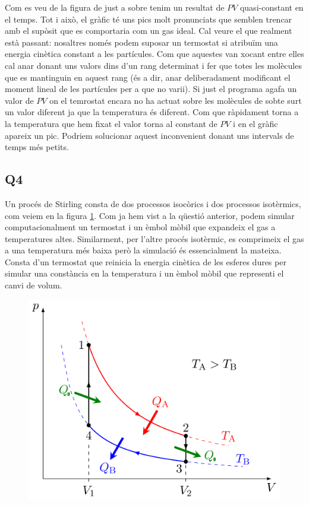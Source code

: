 \documentclass{article}
\begin{document}
	Com es veu de la figura de just a sobre tenim un resultat de $PV$ quasi-constant en el temps. Tot i això, el gràfic té uns pics molt pronunciats que semblen trencar amb el supòsit que es comportaria com un gas ideal. Cal veure el que realment està passant: nosaltres només podem suposar un termostat si atribuïm una energia cinètica constant a les partícules. Com que aquestes van xocant entre elles cal anar donant uns valors dins d'un rang determinat i fer que totes les molècules que es mantinguin en aquest rang (és a dir, anar deliberadament modificant el moment lineal de les partícules per a que no varii). Si just el programa agafa un valor de $PV$ on el temrostat encara no ha actuat sobre les molècules de sobte surt un valor diferent ja que la temperatura és diferent. Com que ràpidament torna a la temperatura que hem fixat el valor torna al constant de $PV$ i en el gràfic apareix un pic. Podriem solucionar aquest inconvenient donant uns intervals de temps més petits.
	
	
	
	\subsection*{Q4}
	Un procés de Stirling consta de dos processos isocòrics i dos processos isotèrmics, com veiem en la figura \ref{gurururur}.
	Com ja hem vist a la qüestió anterior, podem simular computacionalment un termostat i un èmbol mòbil que expandeix el gas a temperatures altes. Similarment, per l'altre procés isotèrmic, es comprimeix el gas a una temperatura més baixa però la simulació és essencialment la mateixa. Consta d'un termostat que reinicia la energia cinètica de les esferes dures per simular una constància en la temperatura i un èmbol mòbil que representi el canvi de volum.\\
	\begin{figure}[h!]
		\centering
		\includegraphics[width=0.5\linewidth]{Ciclo_de_Stirling_pV.png}
		\caption{}
		\label{gurururur}
	\end{figure}	
	
\end{document}
